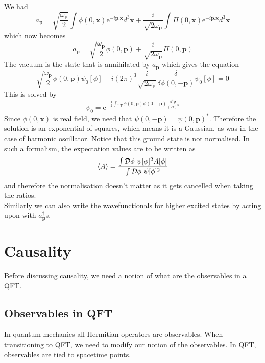 \documentclass[11pt]{article}
\newcommand{\e}{\mathrm{e}}
\newcommand{\w}{\omega}
\newcommand{\D}{\mathcal{D}}
\numberwithin{equation}{section}
\begin{document}
    We had 
    \begin{equation}
        a_\textbf{p} = \sqrt{\frac{\w_\textbf{p}}{2}}\int\phi(0, \textbf{x}) \e^{-i \textbf{p}. \textbf{x}}d^3\textbf{x} + \frac{i}{\sqrt{2\w_\textbf{p}}}\int \Pi(0, \textbf{x})\e^{-i \textbf{p}.\textbf{x}} d^3\textbf{x} 
    \end{equation}
    which now becomes 
    \begin{equation}
        a_\textbf{p} = \sqrt{\frac{\w_\textbf{p}}{2}}\phi(0, \textbf{p}) + \frac{i}{\sqrt{2\w_\textbf{p}}}\Pi(0,\textbf{p})
    \end{equation}
    The vacuum is the state that is annihilated by \(a_\textbf{p}\) which gives the equation
    \begin{equation}
        \sqrt{\frac{\w_\textbf{p}}{2}}\phi(0, \textbf{p}) \psi_0[\phi] -i(2\pi)^3 \frac{i}{\sqrt{2\w_\textbf{p}}}\frac{\delta}{\delta \phi(0, -\textbf{p})}\psi_0[\phi] = 0
    \end{equation}
    This is solved by 
    \begin{equation}
        \psi_0 = \displaystyle\e^{-\frac{1}{2}\int \w_\textbf{p} \phi(0, \textbf{p})\phi(0, -\textbf{p})\frac{d^3\textbf{p}}{(2\pi)^3}}
    \end{equation}
    Since \(\phi(0, \textbf{x})\) is real field, we need that \(\psi(0, -\textbf{p}) = \psi(0, \textbf{p})^*\). Therefore the solution is an exponential of squares, which means it is a Gaussian, as was in the case of harmonic oscillator. Notice that this ground state is not normalised. In such a formalism, the expectation values are to be written as 
    \begin{equation}
        \braket{A} = \displaystyle \frac{\int \D \phi ~ \psi[\phi]^2 A[\phi] }{\int \D \phi ~ \psi[\phi]^2}
    \end{equation}
    and therefore the normalisation doesn't matter as it gets cancelled when taking the ratios.\\

    Similarly we can also write the wavefunctionals for higher excited states by acting upon with \(a^\dagger_\textbf{p}\)s.

    \newpage
    \section{Causality}
    Before discussing causality, we need a notion of what are the observables in a QFT. 

    \subsection{Observables in QFT}
    In quantum mechanics all Hermitian operators are observables. When transitioning to QFT, we need to modify our notion of the observables. In QFT, observables are tied to spacetime points.\\
\end{document}
